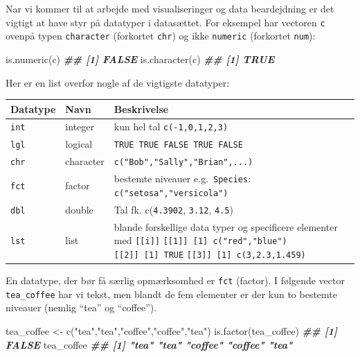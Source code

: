 \documentclass[
]{book}
\newenvironment{Shaded}{\begin{snugshade}}{\end{snugshade}}
\newcommand{\DocumentationTok}[1]{\textcolor[rgb]{0.56,0.35,0.01}{\textbf{\textit{#1}}}}
\newcommand{\FunctionTok}[1]{\textcolor[rgb]{0.00,0.00,0.00}{#1}}
\newcommand{\NormalTok}[1]{#1}
\newcommand{\OtherTok}[1]{\textcolor[rgb]{0.56,0.35,0.01}{#1}}
\newcommand{\StringTok}[1]{\textcolor[rgb]{0.31,0.60,0.02}{#1}}
\begin{document}
Nar vi kommer til at arbejde med visualiseringer og data beardejdning er det vigtigt at have styr på datatyper i datasættet. For eksempel har vectoren \texttt{c} ovenpå typen \texttt{character} (forkortet \texttt{chr}) og ikke \texttt{numeric} (forkortet \texttt{num}):

\begin{Shaded}
\begin{Highlighting}[]
\FunctionTok{is.numeric}\NormalTok{(c)}
\DocumentationTok{\#\# [1] FALSE}
\FunctionTok{is.character}\NormalTok{(c)}
\DocumentationTok{\#\# [1] TRUE}
\end{Highlighting}
\end{Shaded}

Her er en list overfor nogle af de vigtigste datatyper:

\begin{longtable}[]{@{}
  >{\raggedright\arraybackslash}p{}
  >{\raggedright\arraybackslash}p{}
  >{\raggedright\arraybackslash}p{}@{}}
\toprule
Datatype & Navn & Beskrivelse \\
\midrule
\endhead
\texttt{int} & integer & kun hel tal \texttt{c(-1,0,1,2,3)} \\
\texttt{lgl} & logical & \texttt{TRUE\ TRUE\ FALSE\ TRUE\ FALSE} \\
\texttt{chr} & character & \texttt{c("Bob","Sally","Brian",...)} \\
\texttt{fct} & factor & bestemte niveauer e.g.~\texttt{Species}: \texttt{c("setosa","versicola")} \\
\texttt{dbl} & double & Tal fk. c(\texttt{4.3902}, \texttt{3.12}, \texttt{4.5}) \\
\texttt{lst} & list & blande forskellige data typer og specificere elementer med \texttt{{[}{[}i{]}{]}} \texttt{{[}{[}1{]}{]}\ {[}1{]}\ c("red","blue")} \texttt{{[}{[}2{]}{]}\ {[}1{]}\ TRUE} \texttt{{[}{[}3{]}{]}\ {[}1{]}\ c(3,2.3,1.459)} \\
\bottomrule
\end{longtable}

En datatype, der bør få særlig opmærksomhed er \texttt{fct} (factor). I følgende vector \texttt{tea\_coffee} har vi tekst, men blandt de fem elementer er der kun to bestemte niveauer (nemlig ``tea'' og ``coffee'').

\begin{Shaded}
\begin{Highlighting}[]
\NormalTok{tea\_coffee }\OtherTok{\textless{}{-}} \FunctionTok{c}\NormalTok{(}\StringTok{"tea"}\NormalTok{,}\StringTok{"tea"}\NormalTok{,}\StringTok{"coffee"}\NormalTok{,}\StringTok{"coffee"}\NormalTok{,}\StringTok{"tea"}\NormalTok{)}
\FunctionTok{is.factor}\NormalTok{(tea\_coffee)}
\DocumentationTok{\#\# [1] FALSE}
\NormalTok{tea\_coffee}
\DocumentationTok{\#\# [1] "tea"    "tea"    "coffee" "coffee" "tea"}
\end{Highlighting}
\end{Shaded}
\end{document}
